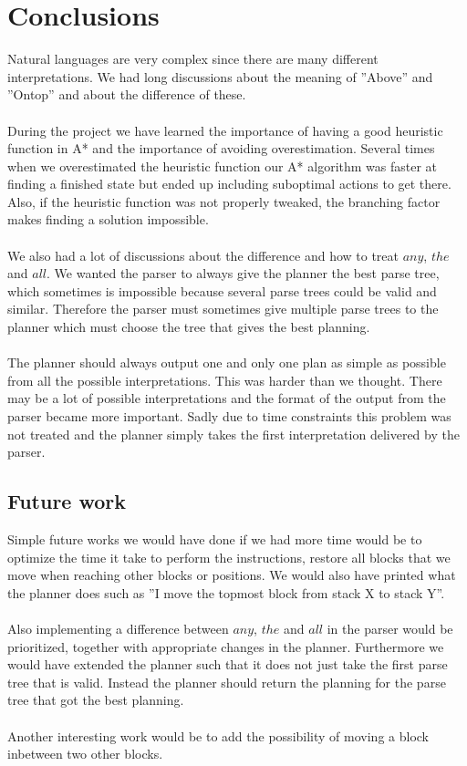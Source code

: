 \chapter{Conclusions}
Natural languages are very complex since there are many different
interpretations. We had long discussions about the meaning of ''Above'' and
''Ontop'' and about the difference of these.  
\\\\
During the project we have learned the importance of having a good heuristic
function in A* and the importance of avoiding overestimation. Several times
when we overestimated the heuristic function our A* algorithm was faster at
finding a finished state but ended up including suboptimal actions to get there. 
Also, if the heuristic function was not properly tweaked, the branching factor
makes finding a solution impossible.
\\\\
We also had a lot of discussions about the difference and how to treat $any$,
$the$ and $all$. We wanted the parser to always give the planner the best parse
tree, which sometimes is impossible because several parse trees could be valid
and similar. Therefore the parser must sometimes give multiple parse trees to
the planner which must choose the tree that gives the best planning.
\\\\
The planner should always output one and only one plan as simple as possible
from all the possible interpretations. This was harder than we thought.  There
may be a lot of possible interpretations and the format of the output from the
parser became more important. Sadly due to time constraints this problem was not
treated and the planner simply takes the first interpretation delivered by the
parser. 

\newpage 

\section{Future work}

Simple future works we would have done if we had more time would be to optimize
the time it take to perform the instructions, restore all blocks that we move
when reaching other blocks or positions. We would also have printed what the
planner does such as ''I move the topmost block from stack X to stack Y''.
\\\\
Also implementing a difference between $any$, $the$ and $all$ in the parser
would be prioritized, together with appropriate changes in the planner.
Furthermore we would have extended the planner such that it does not just take
the first parse tree that is valid. Instead the planner should return the
planning for the parse tree that got the best planning. 
\\\\
Another interesting work would be to add the possibility of moving a block
inbetween two other blocks. 
